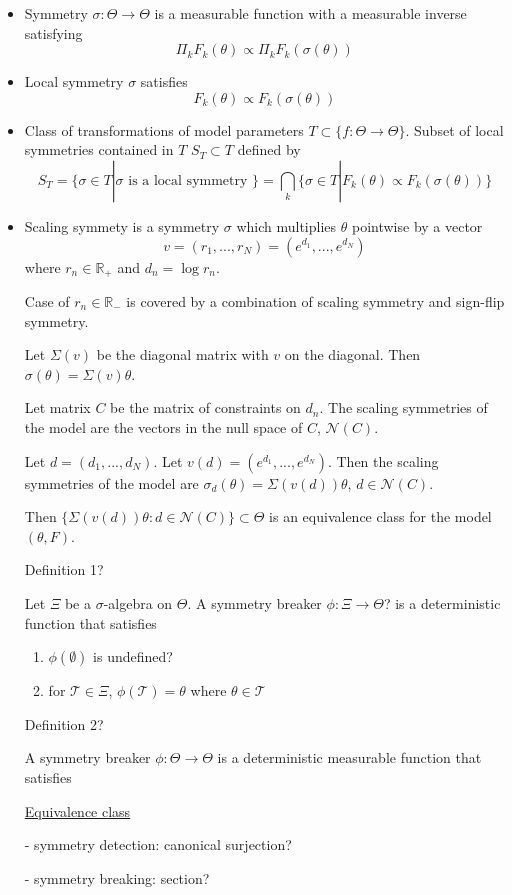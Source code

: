 \documentclass{article}
\begin{document}
\begin{itemize}

\item
Symmetry $\sigma:\Theta\rightarrow\Theta$ is a measurable function with a measurable inverse satisfying
\[
\Pi_kF_k(\theta)\propto\Pi_kF_k\left(\sigma(\theta)\right)
\]

\item
Local symmetry $\sigma$ satisfies
\[
F_k(\theta) \propto F_k\left(\sigma(\theta)\right)
\]

\item
Class of transformations of model parameters $T\subset\{f:\Theta\rightarrow\Theta\}$. Subset of local symmetries contained in $T$ $S_T\subset T$ defined by
\[
S_T=\{\sigma\in T|\sigma \text{ is a local symmetry }\} = \bigcap_k\{\sigma\in T | F_k(\theta)\propto F_k\left(\sigma(\theta)\right)\}
\]

\item
Scaling symmety is a symmetry $\sigma$ which multiplies $\theta$ pointwise by a vector
\[
v=(r_1,...,r_N) = (e^{d_1},...,e^{d_N})
\]
where $r_n\in \mathbb{R}_+$ and $d_n=\log r_n$.

Case of $r_n\in\mathbb{R}_-$ is covered by a combination of scaling symmetry and sign-flip symmetry.

Let $\Sigma(v)$ be the diagonal matrix with $v$ on the diagonal. Then $\sigma(\theta)=\Sigma(v)\theta$.

Let matrix $C$ be the matrix of constraints on $d_n$. The scaling symmetries of the model are the vectors in the null space of $C$, $\mathcal{N}(C)$.

Let $d=(d_1,...,d_N)$. Let $v(d) = (e^{d_1},...,e^{d_N})$. Then the scaling symmetries of the model are $\sigma_{d}(\theta)=\Sigma(v(d))\theta$, $d\in\mathcal{N}(C)$.

Then $\{\Sigma(v(d))\theta:d\in\mathcal{N}(C)\}\subset\Theta$ is an equivalence class for the model $(\theta,F)$.

Definition 1?

Let $\Xi$ be a $\sigma$-algebra on $\Theta$. A symmetry breaker $\phi:\Xi\rightarrow\Theta$? is a deterministic function that satisfies
\begin{enumerate}

\item
$\phi(\emptyset)$ is undefined?

\item
for $\mathcal{T}\in\Xi$, $\phi(\mathcal{T})=\theta$ where $\theta\in\mathcal{T}$

\end{enumerate}

Definition 2?

A symmetry breaker $\phi:\Theta\rightarrow\Theta$ is a deterministic measurable function that satisfies

\href{https://en.wikipedia.org/wiki/Equivalence_class}{Equivalence class}

- symmetry detection: canonical surjection?

- symmetry breaking: section?

\end{itemize}
\end{document}
